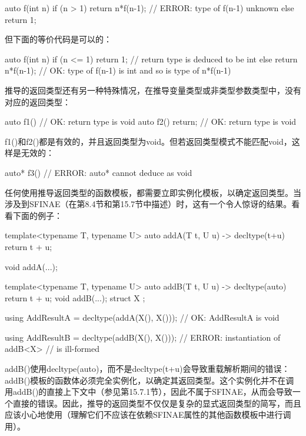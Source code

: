 \begin{cpp}
auto f(int n)
{
	if (n > 1) {
		return n*f(n-1); // ERROR: type of f(n-1) unknown
	} else {
		return 1;
	}
}
\end{cpp}

但下面的等价代码是可以的：

\begin{cpp}
auto f(int n)
{
	if (n <= 1) {
		return 1; // return type is deduced to be int
	} else {
		return n*f(n-1); // OK: type of f(n-1) is int and so is type of n*f(n-1)
	}
}
\end{cpp}

推导的返回类型还有另一种特殊情况，在推导变量类型或非类型参数类型中，没有对应的返回类型：

\begin{cpp}
auto f1() { } // OK: return type is void
auto f2() { return; } // OK: return type is void
\end{cpp}

f1()和f2()都是有效的，并且返回类型为void。但若返回类型模式不能匹配void，这样是无效的：

\begin{cpp}
auto* f3() {} // ERROR: auto* cannot deduce as void
\end{cpp}

任何使用推导返回类型的函数模板，都需要立即实例化模板，以确定返回类型。当涉及到SFINAE（在第8.4节和第15.7节中描述）时，这有一个令人惊讶的结果。看看下面的例子：

\begin{cpp}
template<typename T, typename U>
auto addA(T t, U u) -> decltype(t+u)
{
	return t + u;
}

void addA(...);

template<typename T, typename U>
auto addB(T t, U u) -> decltype(auto)
{
	return t + u;
}
void addB(...);
struct X {
};

using AddResultA = decltype(addA(X(), X())); // OK: AddResultA is void

using AddResultB = decltype(addB(X(), X())); // ERROR: instantiation of addB<X>
// is ill-formed
\end{cpp}

addB()使用decltype(auto)，而不是decltype(t+u)会导致重载解析期间的错误：addB()模板的函数体必须完全实例化，以确定其返回类型。这个实例化并不在调用addB()的直接上下文中（参见第15.7.1节），因此不属于SFINAE，从而会导致一个直接的错误。因此，推导的返回类型不仅仅是复杂的显式返回类型的简写，而且应该小心地使用（理解它们不应该在依赖SFINAE属性的其他函数模板中进行调用）。

